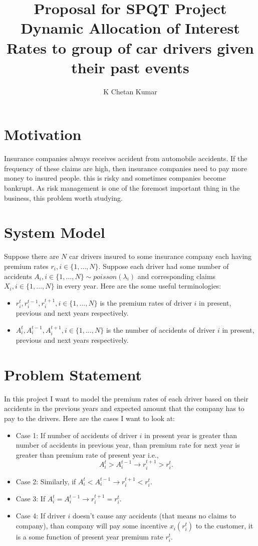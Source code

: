 \documentclass[a4paper,english,12pt]{article}
\title{\textbf{Proposal for SPQT Project\\Dynamic Allocation of Interest Rates to group of car drivers given their past events}}
\author{K Chetan Kumar}
\begin{document}
\maketitle

\section{Motivation}
Insurance companies always receives accident from automobile accidents. If the frequency of these claims are high, then insurance companies need to pay more money to insured people. this is risky and sometimes companies become bankrupt. As risk management is one of the foremost important thing in the business, this problem worth studying.

\section{System Model}
Suppose there are $N$ car drivers insured to some insurance company each having premium rates $r_i, i\in \{1, \dots, N\}$. Suppose each driver had some number of accidents $A_i, i\in\{1,\dots,N\} \sim poisson(\lambda_i)$ and corresponding claims $X_i, i\in\{1,\dots,N\}$ in every year. Here are the some useful terminologies:
\begin{itemize}
\item $r_i^t, r_i^{t-1}, r_i^{t+1}, i\in\{1,\dots,N\}$ is the premium rates of driver $i$ in present, previous and next years respectively.
\item $A_i^t, A_i^{t-1}, A_i^{t+1}, i\in\{1,\dots,N\}$ is the number of accidents of driver $i$ in present, previous and next years respectively.
\end{itemize}
\section{Problem Statement}
In this project I want to model the premium rates of each driver based on their accidents in the previous years and expected amount that the company has to pay to the drivers. Here are the cases I want to look at:

\begin{itemize}
\item Case 1: If number of accidents of driver $i$ in present year is greater than number of accidents in previous year, than premium rate for next year is greater than premium rate of present year i.e.,  
\begin{equation*}
A_i^t > A_i^{t-1} \rightarrow r_i^{t+1} > r_i^t.
\end{equation*}
\item Case 2: Similarly, if $ A_i^t < A_i^{t-1} \rightarrow r_i^{t+1} < r_i^t $.
\item Case 3: If $ A_i^t = A_i^{t-1} \rightarrow r_i^{t+1} = r_i^t $.
\item Case 4: If driver $i$ doesn't cause any accidents (that means no claims to company), than company will pay some incentive $x_i(r_i^t)$ to the customer, it is a some function of present year premium rate $r_i^t$.
\end{itemize}
\end{document}
